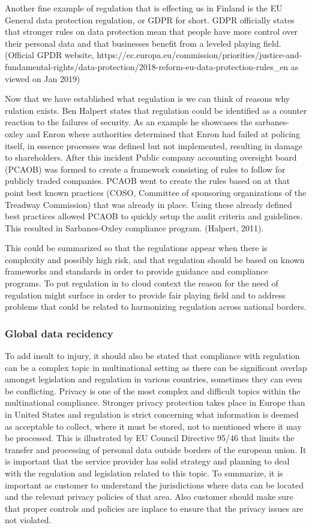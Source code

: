 \documentclass{article}
\begin{document}
Another fine example of regulation that is effecting us in Finland is the EU General data protection regulation, or GDPR for short. GDPR officially states that stronger rules on data protection mean that people have more control over their personal data and that businesses benefit from a leveled playing field. (Official GPDR website, https://ec.europa.eu/commission/priorities/justice-and-fundamental-rights/data-protection/2018-reform-eu-data-protection-rules\_en as viewed on Jan 2019)
\par
Now that we have established what regulation is we can think of reasons why rulation exists. Ben Halpert states that regulation could be identified as a counter reaction to the failures of security. As an example he showcases the sarbanes-oxley and Enron where authorities determined that Enron had failed at policing itself, in essence processes was defined but not implemented, resulting in damage to shareholders. After this incident Public company accounting oversight board (PCAOB) was formed to create a framework consisting of rules to follow for publicly traded companies.
PCAOB went to create the rules based on at that point best known practices (COSO, Committee of sponsoring organizations of the Treadway Commission) that was already in place. Using these already defined best practices allowed PCAOB to quickly setup the audit criteria and guidelines. This resulted in Sarbanes-Oxley compliance program.
(Halpert, 2011).
\par
This could be summarized so that the regulations appear when there is complexity and possibly high risk, and that regulation should be based on known frameworks and standards in order to provide guidance and compliance programs.
To put regulation in to cloud context the reason for the need of regulation might surface in order to provide fair playing field and to address problems that could be related to harmonizing regulation across national borders.
\subsubsection{Global data recidency}
To add insult to injury, it should also be stated that compliance with regulation can be a complex topic in multinational setting as there can be significant overlap amongst legislation and regulation in various countries, sometimes they can even be conflicting. Privacy is one of the most complex and difficult topics within the multinational compliance. Stronger privacy protection takes place in Europe than in United States and regulation is strict concerning what information is deemed as acceptable to collect, where it must be stored, not to mentioned where it may be processed. This is illustrated by EU Council Directive 95/46 that limits the transfer and processing of personal data outside borders of the european union. It is important that the service provider has solid strategy and planning to deal with the regulation and legislation related to this topic. To summarize, it is important as customer to understand the jurisdictions where data can be located and the relevant privacy policies of that area. Also customer should make sure that proper controls and policies are inplace to ensure that the privacy issues are not violated. 
\end{document}
